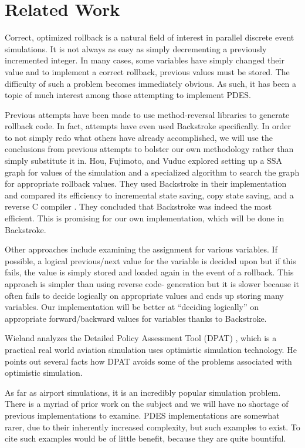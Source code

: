 \section {Related Work}

Correct, optimized rollback is a natural field of interest in parallel discrete event simulations. It is
not always as easy as simply decrementing a previously incremented integer. In many cases,
some variables have simply changed their value and to implement a correct rollback, previous
values must be stored. The difficulty of such a problem becomes immediately obvious. As such,
it has been a topic of much interest among those attempting to implement PDES.

Previous attempts have been made to use method-reversal libraries to generate rollback code.
In fact, attempts have even used Backstroke specifically. In order to not simply redo what others
have already accomplished, we will use the conclusions from previous attempts to bolster our
own methodology rather than simply substitute it in. Hou, Fujimoto,
and Vuduc explored setting up a SSA graph for values of the simulation and a
specialized algorithm to search the graph for appropriate rollback values. They used Backstroke
in their implementation and compared its efficiency to incremental state saving, copy state
saving, and a reverse C compiler \cite {careff} \cite{fujane}. They concluded that Backstroke was indeed the most
efficient. This is promising for our own implementation, which will be done in Backstroke.

Other approaches include examining the assignment for various variables. If possible, a logical
previous/next value for the variable is decided upon but if this fails, the value is simply stored
and loaded again in the event of a rollback. This approach is simpler than using reverse code-
generation but it is slower because it often fails to decide logically on appropriate values and
ends up storing many variables. Our implementation will be better at “deciding logically” on
appropriate forward/backward values for variables thanks to Backstroke.

Wieland analyzes the Detailed Policy Assessment Tool (DPAT) \cite{wiepar2} \cite{wiepra}, which is a practical real world
aviation simulation uses optimistic simulation technology. He points out several facts how DPAT
avoids some of the problems associated with optimistic simulation.

As far as airport simulations, it is an incredibly popular simulation problem. There is a myriad of
prior work on the subject and we will have no shortage of previous implementations to examine.
PDES implementations are somewhat rarer, due to their inherently increased complexity, but
such examples to exist. To cite such examples would be of little benefit, because they are quite
bountiful.
